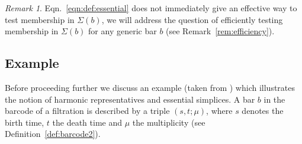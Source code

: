 \documentclass[11pt]{amsart}
\theoremstyle{theorem}
\theoremstyle{remark}
\newtheorem{remark}{Remark}[section]
\theoremstyle{definition}
\begin{document}
\begin{remark}
   \label{rem:def:essential:efficiency} 
Eqn.~\eqref{eqn:def:essential} does not immediately give an effective way to test membership in $\Sigma(b)$, we will address the question of efficiently testing membership in $\Sigma(b)$ for any generic bar $b$ (see Remark~\ref{rem:efficiency}). 
\end{remark}
\subsection{Example}
\label{subsec:Example}

Before proceeding further we discuss an example (taken from \cite{Basu-Cox}) which illustrates the notion
of harmonic representatives and essential simplices. 
A bar $b$ in the barcode of a filtration is described by a triple $(s,t;\mu)$,
where $s$ denotes the birth time, $t$ the death time and $\mu$ the multiplicity 
(see Definition~\ref{def:barcode2}).
\end{document}
